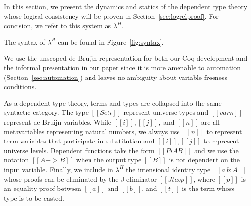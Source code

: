 \documentclass[acmsmall,screen=true,
\ifpublic review=false\else,review=true\fi
  ,anonymous=\ifanonymous true\else false\fi]{acmart}
\newcommand{\lang}{$\lambda^H$\xspace}
\newcommand{\scw}[1]{}
\newcommand{\yl}[1]{}
\begin{document}
In this section, we present the dynamics and statics of the
dependent type theory whose logical consistency will be proven in
Section~\ref{sec:logrelproof}. For concision, we refer to this system
as \lang.

The syntax of \lang can be found in Figure~\ref{fig:syntax}.
\scw{Why so many metavariables for terms? Do you need $c$, $p$ and $t$?}
We use
the unscoped de Bruijn representation for both our Coq development and
the informal presentation in our paper since it is more amenable to
automation (Section~\ref{sec:automation}) and leaves no ambiguity
about variable freeness conditions.

As a dependent type theory, terms and types are collapsed into the same
syntactic category. The type $[[Set i]]$ represent universe
types and $[[var n]]$ represent de Bruijn variables. While
$[[i]],[[j]],$ and $[[n]]$ are all metavariables representing natural
numbers, we always use $[[n]]$ to represent term variables that
participate in substitution and $[[i]],[[j]]$ to represent universe levels.
Dependent functions take the form $[[Pi A B]]$ and
we use the notation $[[A -> B]]$ when the output type $[[B]]$ is not
dependent on the input variable.
Finally, we include in \lang{} the intensional identity type $[[a ~ b : A]]$ whose
proofs can be eliminated by the J-eliminator $[[J t a b p]]$, where
$[[p]]$ is an equality proof between $[[a]]$ and $[[b]]$, and $[[t]]$
is the term whose type is to be casted.
\scw{Example of what you can use identity types for? Or an example of
a program that uses J?}

\end{document}
